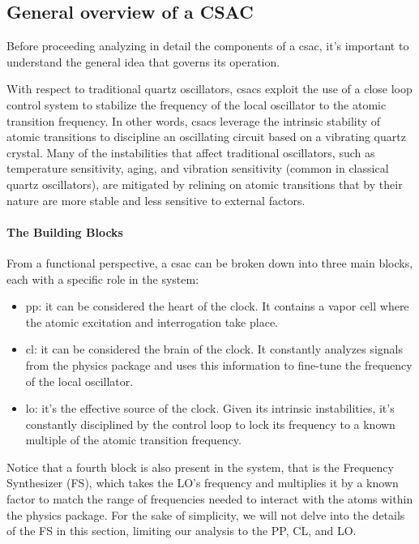 \subsection{General overview of a CSAC}
\label{subsec:general_overview}

Before proceeding analyzing in detail the components of a \acrshort{csac}, it's important to understand the general idea that governs its operation.

With respect to traditional quartz oscillators, \acrshort{csacs} exploit the use of a close loop control system to stabilize the frequency of the local oscillator to the atomic transition frequency.
In other words, \acrshort{csacs} leverage the intrinsic stability of atomic transitions to discipline an oscillating circuit based on a vibrating quartz crystal.
Many of the instabilities that affect traditional oscillators, such as temperature sensitivity, aging, and vibration sensitivity (common in classical quartz oscillators), are mitigated by relining on atomic transitions that by their nature are more stable and less sensitive to external factors.

\paragraph{The Building Blocks}

From a functional perspective, a \acrshort{csac} can be broken down into three main blocks, each with a specific role in the system:

\begin{itemize}
    \item \acrfull{pp}: it can be considered the heart of the clock. It contains a vapor cell where the atomic excitation and interrogation take place.
    \item \acrfull{cl}: it can be considered the brain of the clock. It constantly analyzes signals from the physics package and uses this information to fine-tune the frequency of the local oscillator.
    \item \acrfull{lo}: it's the effective source of the clock. Given its intrinsic instabilities, it's constantly disciplined by the control loop to lock its frequency to a known multiple of the atomic transition frequency.
\end{itemize}

Notice that a fourth block is also present in the system, that is the Frequency Synthesizer (FS), which takes the LO's frequency and multiplies it by a known factor to match the range of frequencies needed to interact with the atoms within the physics package.
For the sake of simplicity, we will not delve into the details of the FS in this section, limiting our analysis to the PP, CL, and LO.

